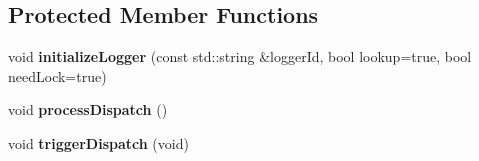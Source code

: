 \subsection*{Protected Member Functions}
\begin{DoxyCompactItemize}
\item 
\hypertarget{classel_1_1base_1_1Writer_ae687ebbee62b086f318ee4c8d1a655c4}{void {\bfseries initialize\-Logger} (const std\-::string \&logger\-Id, bool lookup=true, bool need\-Lock=true)}\label{classel_1_1base_1_1Writer_ae687ebbee62b086f318ee4c8d1a655c4}

\item 
\hypertarget{classel_1_1base_1_1Writer_a692d05d209840d6ae8c2c8e0bea21d29}{void {\bfseries process\-Dispatch} ()}\label{classel_1_1base_1_1Writer_a692d05d209840d6ae8c2c8e0bea21d29}

\item 
\hypertarget{classel_1_1base_1_1Writer_a1c7d90bd4e00af4e7307f5936e1b6507}{void {\bfseries trigger\-Dispatch} (void)}\label{classel_1_1base_1_1Writer_a1c7d90bd4e00af4e7307f5936e1b6507}

\end{DoxyCompactItemize}
